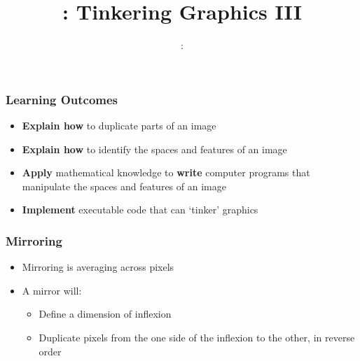 \usepackage{../../beamerthemeFalmouthGamesAcademy}
\usepackage{multimedia}
\graphicspath{ {../../} }


\usepackage[normalem]{ulem}
\usepackage{wasysym}

\usepackage{pdfpages}

\usetikzlibrary{arrows,automata}





\title{\sessionnumber: Tinkering Graphics III}
\subtitle{\modulecode: \moduletitle}

\frame{\titlepage} 

\begin{frame}
	\frametitle{Learning Outcomes}
	\begin{itemize}
		\item \textbf{Explain how} to duplicate parts of an image
		\item \textbf{Explain how} to identify the spaces and features of an image
		\item \textbf{Apply} mathematical knowledge to \textbf{write} computer programs that manipulate the spaces and features of an image
		\item \textbf{Implement} executable code that can `tinker' graphics
	\end{itemize}
\end{frame}


\begin{frame}
	\frametitle{Mirroring}
	
	\begin{itemize}		
		\item Mirroring is averaging across pixels
		\item A mirror will:
		\begin{itemize}
			\item Define a dimension of inflexion
			\item Duplicate pixels from the one side of the inflexion to the other, in reverse order
		\end{itemize}	
	\end{itemize}
\end{frame}

